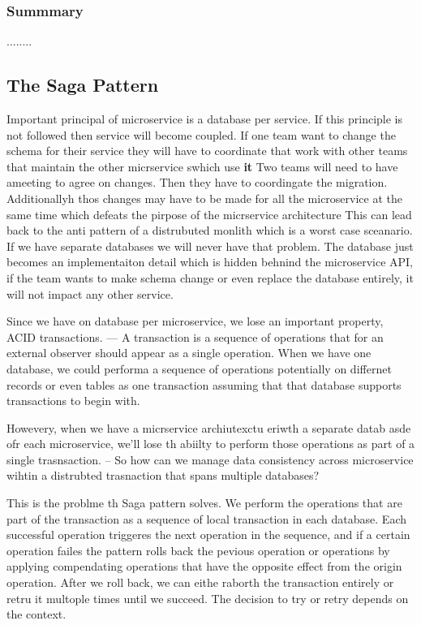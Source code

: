 \documentclass[a4paper, 11pt]{book}
\begin{document}
    \subsubsection{Summmary}
    ........

    \subsection{The Saga Pattern}
    Important principal of microservice is a database per service.
    If this principle is not followed then service will become coupled.
    If one team want to change the schema for their service they will have to coordinate that work with other teams that maintain the other micrservice swhich use \textbf{it}
    Two teams will need to have ameeting to agree on changes.
    Then they have to coordingate the migration.
    Additionallyh thos changes may have to be made for all the microservice at the same time which defeats the pirpose of the micrservice architecture
    This can lead back to the anti pattern of a distrubuted monlith which is a worst case sceanario.
    If we have separate databases we will never have that problem.
    The database just becomes an implementaiton detail which is hidden behnind the microservice API, if the team wants to make schema change or even replace the database entirely, it will not impact any other service.

    Since we have on database per microservice, we lose an important property, ACID transactions.
    --- A transaction is a sequence of operations that for an external observer should appear as a single operation.
    When we have one database, we could performa a sequence of operations potentially on differnet records or even tables as one transaction assuming that that database supports transactions to begin with.

    Howevery, when we have a micrservice archiutexctu eriwth a separate datab asde ofr each microservice, we'll lose th abiilty to perform those operations as part of a single trasnsaction.
    -- So how can we manage data consistency across microservice wihtin a distrubted trasnaction that spans multiple databases?

    This is the problme th Saga pattern solves.
    We perform the operations that are part of the transaction as a sequence of local transaction in each database.
    Each successful operation triggeres the next operation in the sequence, and if a certain operation failes the pattern rolls back the pevious operation or operations by applying compendating operations that have the opposite effect from the origin operation.
    After we roll back, we can eithe raborth the transaction entirely or retru it multople times until we succeed.
    The decision to try or retry depends on the context.
\end{document}
